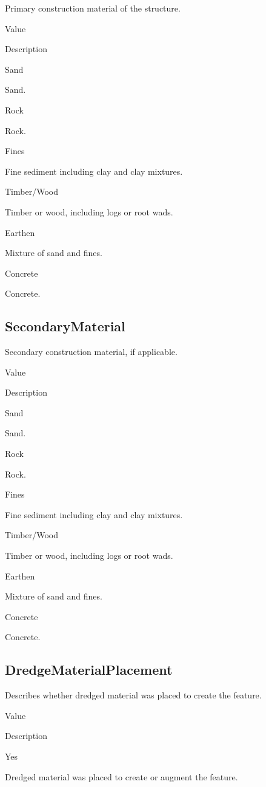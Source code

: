 \documentclass[
  letterpaper,
  DIV=11,
  numbers=noendperiod]{scrreprt}
\begin{document}
Primary construction material of the structure.

Value

Description

Sand

Sand.

Rock

Rock.

Fines

Fine sediment including clay and clay mixtures.

Timber/Wood

Timber or wood, including logs or root wads.

Earthen

Mixture of sand and fines.

Concrete

Concrete.

\subsection{SecondaryMaterial}\label{secondarymaterial-1}

Secondary construction material, if applicable.

Value

Description

Sand

Sand.

Rock

Rock.

Fines

Fine sediment including clay and clay mixtures.

Timber/Wood

Timber or wood, including logs or root wads.

Earthen

Mixture of sand and fines.

Concrete

Concrete.

\subsection{DredgeMaterialPlacement}\label{dredgematerialplacement-1}

Describes whether dredged material was placed to create the feature.

Value

Description

Yes

Dredged material was placed to create or augment the feature.
\end{document}
